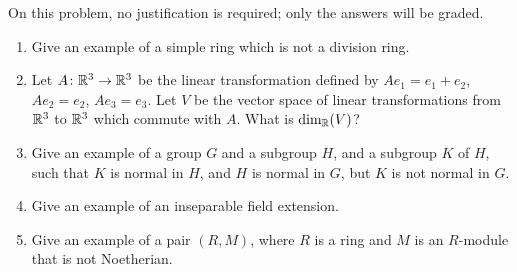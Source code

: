 %
\begin{question}[subtitle=January 2024 Problem 1,ID=Jan24_1]
On this problem, no justification is required; only the answers will be graded.
\begin{enumerate}
    \item Give an example of a simple ring which is not a division ring.
    \item Let $A \colon \mathbb{R}^3 \to \mathbb{R}^3$ be the linear transformation defined by $Ae_1 = e_1 + e_2$, $Ae_2 = e_2$, $Ae_3 = e_3$. Let $V$ be the vector space of linear transformations from $\mathbb{R}^3$ to $\mathbb{R}^3$ which commute with $A$. What is $\dim_{\mathbb{R}}(V)$?
    \item Give an example of a group $G$ and a subgroup $H$, and a subgroup $K$ of $H$, such that $K$ is normal in $H$, and $H$ is normal in $G$, but $K$ is not normal in $G$.
    \item Give an example of an inseparable field extension.
    \item Give an example of a pair $(R,M)$, where $R$ is a ring and $M$ is an $R$-module that is not Noetherian.
\end{enumerate}
\end{question}
